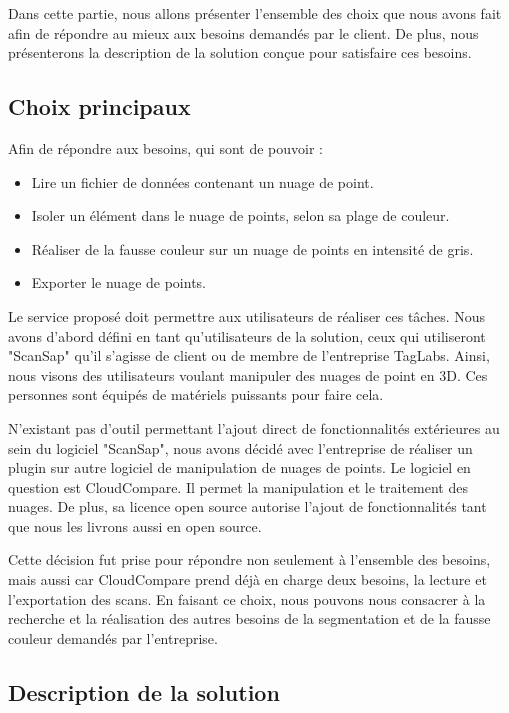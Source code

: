 \documentclass[12pt,titlepage,french]{article}
\begin{document}
Dans cette partie, nous allons présenter l'ensemble des choix que nous avons fait afin de répondre au mieux aux besoins demandés par le client. De plus, nous présenterons la description de la solution conçue pour satisfaire ces besoins.

\subsection{Choix principaux}

Afin de répondre aux besoins, qui sont de pouvoir :
\begin{itemize}
    \item Lire un fichier de données contenant un nuage de point.
    \item Isoler un élément dans le nuage de points, selon sa plage de couleur.
    \item Réaliser de la fausse couleur sur un nuage de points en intensité de gris.
    \item Exporter le nuage de points. \newline
\end{itemize}

Le service proposé doit permettre aux utilisateurs de réaliser ces tâches. Nous avons d'abord défini en tant qu'utilisateurs de la solution, ceux qui utiliseront "ScanSap" qu'il s'agisse de client ou de membre de l'entreprise TagLabs. Ainsi, nous visons des utilisateurs voulant manipuler des nuages de point en 3D. Ces personnes sont équipés de matériels puissants pour faire cela.\newline


N'existant pas d'outil permettant l'ajout direct de fonctionnalités extérieures au sein du logiciel "ScanSap", nous avons décidé avec l'entreprise de réaliser un plugin sur autre logiciel de manipulation de nuages de points. Le logiciel en question est CloudCompare. Il permet la manipulation et le traitement des nuages. De plus, sa licence open source autorise l'ajout de fonctionnalités tant que nous les livrons aussi en open source. \newline

Cette décision fut prise pour répondre non seulement à l'ensemble des besoins, mais aussi car CloudCompare prend déjà en charge deux besoins, la lecture et l'exportation des scans. En faisant ce choix, nous pouvons nous consacrer à la recherche et la réalisation des autres besoins de la segmentation et de la fausse couleur demandés par l'entreprise.

\subsection{Description de la solution}
\end{document}
